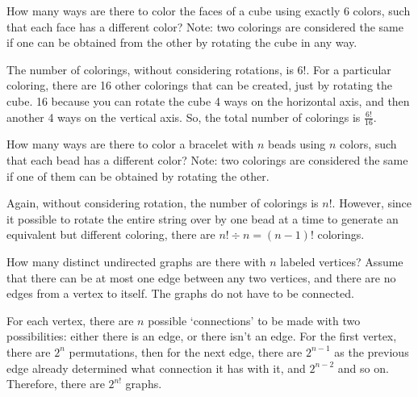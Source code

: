 \documentclass[11pt]{article}
\begin{document}
\begin{Parts}

    \Part How many ways are there to color the faces of a cube using exactly $6$
     colors, such that each face has a different color? Note: two colorings are 
     considered the same if one can be obtained from the other by rotating the 
     cube in any way.
    
    \begin{solution}
        The number of colorings, without considering rotations, is $6!$. For a
        particular coloring, there are 16 other colorings that can be created,
        just by rotating the cube. 16 because you can rotate the cube 4 ways
        on the horizontal axis, and then another 4 ways on the vertical axis.
        So, the total number of colorings is $\frac{6!}{16}$.
    \end{solution}

    \Part How many ways are there to color a bracelet with $n$ beads using $n$ 
    colors, such that each bead has a different color? Note: two colorings are 
    considered the same if one of them can be obtained by rotating the other.
    
    \begin{solution}
        Again, without considering rotation, the number of colorings is $n!$.
        However, since it possible to rotate the entire string over by one bead
        at a time to generate an equivalent but different coloring, there are $n!
        \div n = (n-1)!$ colorings.
    \end{solution}

    \Part How many distinct undirected graphs are there with $n$ labeled vertices? 
    Assume that there can be at most one edge between any two vertices, and there 
    are no edges from a vertex to itself. The graphs do not have to be connected.
    
    \begin{solution}
        For each vertex, there are $n$ possible `connections' to be made with two
        possibilities: either there is an edge, or there isn't an edge. For the 
        first vertex, there are $2^n$ permutations, then for the next edge, there
        are $2^{n-1}$ as the previous edge already determined what connection it has 
        with it, and $2^{n-2}$ and so on. Therefore, there are $2^{n!}$ graphs.
    \end{solution}


\end{Parts}
\end{document}
